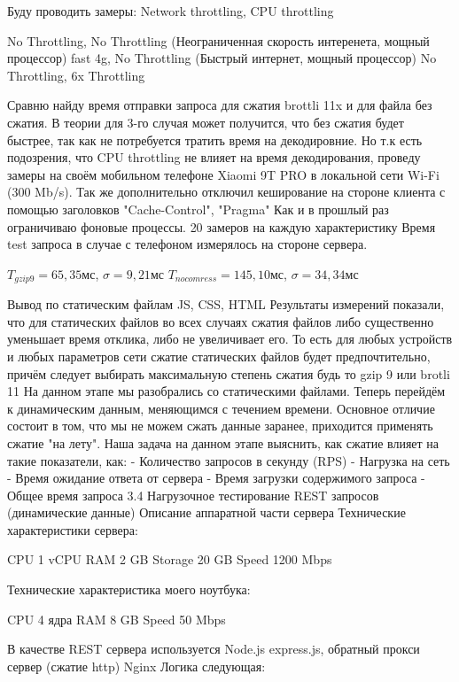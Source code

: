 \documentclass[12pt]{article}
\begin{document}
    Буду проводить замеры:
    Network throttling, CPU throttling

    No Throttling, No Throttling (Неограниченная скорость интеренета, мощный процессор)
    fast 4g, No Throttling (Быстрый интернет, мощный процессор)
    No Throttling, 6x Throttling

    Сравню найду время отправки запроса для сжатия brottli 11x и для файла без сжатия. В теории для 3-го случая может получится, что без сжатия будет быстрее,
    так как не потребуется тратить время на декодировние.
    Но т.к есть подозрения, что CPU throttling не влияет на время декодирования, проведу замеры на своём мобильном телефоне Xiaomi 9T PRO в локальной сети Wi-Fi (300 Mb/s).
    Так же дополнительно отключил кеширование на стороне клиента с помощью заголовков "Cache-Control", "Pragma"
    Как и в прошлый раз ограничиваю фоновые процессы. 20 замеров на каждую характеристику
    Время test запроса в случае с телефоном измерялось на стороне сервера.

$T_{gzip9}=65,35$мс, $\sigma = 9,21$мс
$T_{no comress}=145,10$мс, $\sigma = 34,34$мс

    Вывод по статическим файлам JS, CSS, HTML
    Результаты измерений показали, что для статических файлов во всех случаях сжатия файлов либо существенно уменьшает время отклика, либо не увеличивает его.
    То есть для любых устройств и любых параметров сети сжатие статических файлов будет предпочтительно, причём следует выбирать максимальную степень сжатия будь то gzip 9 или brotli 11
    На данном этапе мы разобрались со статическими файлами. Теперь перейдём к динамическим данным, меняющимся с течением времени. Основное отличие состоит в том, что мы не можем сжать данные заранее, приходится применять сжатие "на лету". Наша задача на данном этапе выяснить, как сжатие влияет на такие показатели, как:
    - Количество запросов в секунду (RPS)
    - Нагрузка на сеть
    - Время ожидание ответа от сервера
    - Время загрузки содержимого запроса
    - Общее время запроса
    3.4 Нагрузочное тестирование REST запросов (динамические данные)
    Описание аппаратной части сервера
    Технические характеристики сервера:

    CPU 1 vCPU
    RAM 2 GB
    Storage 20 GB
    Speed 1200 Mbps

    Технические характеристика моего ноутбука:

    CPU 4 ядра
    RAM 8 GB
    Speed 50 Mbps

    В качестве REST сервера используется Node.js express.js, обратный прокси сервер (сжатие http) Nginx
    Логика следующая:
\end{document}
